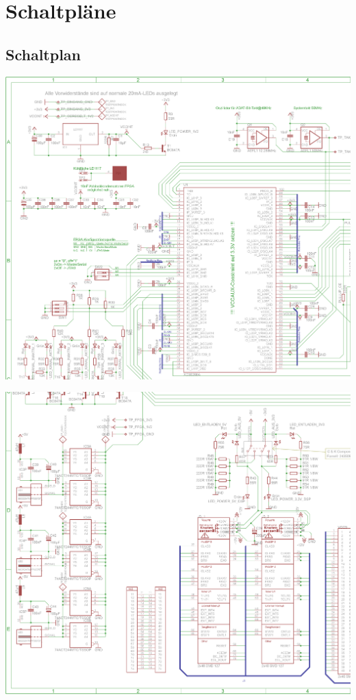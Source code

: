 \chapter{Schaltpläne}
	\section{Schaltplan}
		\includegraphics[width=\linewidth]{Medien/schaltplan1.png}
		\clearpage
		
		\noindent
		\includegraphics[width=\linewidth]{Medien/schaltplan2.png}
		\clearpage
		 
